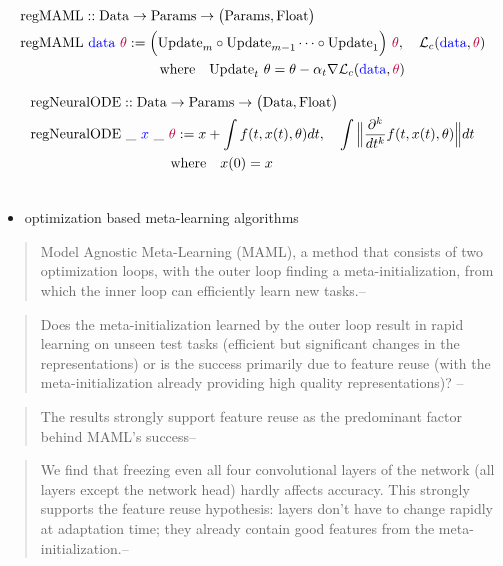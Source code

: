 \documentclass[a4paper,12pt]{article}
\begin{document}
\begin{align*} 
&\text{regMAML} :: \text{Data} \rightarrow \text{Params} \rightarrow \big(\textrm{Params}, \text{Float}\big) \\
&\text{regMAML} \ \textcolor{blue}{\text{data}} \ \textcolor{purple}{\theta} := \Big(\text{Update}_m \circ \text{Update}_{m-1} \dots \circ \text{Update}_1 \Big) \ \textcolor{purple}{\theta}, \quad \mathcal{L}_c(\textcolor{blue}{\text{data}}, \textcolor{purple}{\theta})  \\ 
&  \quad \quad \quad \quad \quad \quad \quad \quad \quad \quad \text{where} \quad  \text{Update}_t \  \theta = \theta - \alpha_t \nabla \mathcal{L}_c(\textcolor{blue}{\text{data}}, \textcolor{purple}{\theta})
\end{align*}

\begin{align*}
    &\text{regNeuralODE} :: \text{Data} \rightarrow \text{Params} \rightarrow \big(\textrm{Data}, \text{Float}\big) \\
&\text{regNeuralODE} \ \_ \ \textcolor{blue}{x} \ \_ \ \textcolor{purple}{\theta} := x + \int f(t, x(t), \theta)dt, \quad \int \Big\| \frac{\partial ^k}{dt^k}f(t, x(t), \theta) \Big\|dt \\ 
& \quad \quad \quad \quad \quad \quad \quad \quad \quad \quad \text{where}  \quad x(0)=x \\ \\ 
\end{align*}
\begin{itemize}
    \item optimization based meta-learning algorithms
\end{itemize}
\begin{quote}
Model Agnostic Meta-Learning (MAML), a method that consists of two optimization loops, with the outer loop finding a meta-initialization,
from which the inner loop can efficiently learn new tasks.-- \cite{raghu2019rapid}
\end{quote}
\begin{quote}
    Does the meta-initialization learned by the
outer loop result in rapid learning on unseen test tasks (efficient but significant changes in the
representations) or is the success primarily due to feature reuse (with the meta-initialization already
providing high quality representations)? -- \cite{raghu2019rapid}
\end{quote}
\begin{quote}
    The results strongly support feature reuse as the predominant factor
behind MAML’s success-- \cite{raghu2019rapid}
\end{quote}
\begin{quote}
    We find that freezing even all four convolutional layers of the network (all layers except the network head) hardly
affects accuracy. This strongly supports the feature reuse hypothesis: layers don’t have to change rapidly at
adaptation time; they already contain good features from the meta-initialization.-- \cite{raghu2019rapid}
\end{quote}
\end{document}
